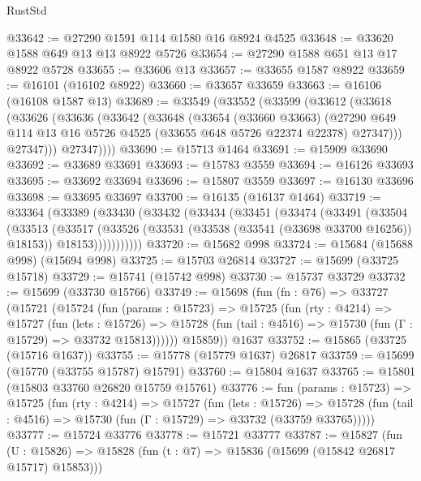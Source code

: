 \begin{lexlean}{RustStd}
\begin{coremodule}
@33642 := @27290 @1591 @114 @1580 @16 @8924 @4525
@33648 := @33620 @1588 @649 @13 @13 @8922 @5726
@33654 := @27290 @1588 @651 @13 @17 @8922 @5728
@33655 := @33606 @13
@33657 := @33655 @1587 @8922
@33659 := @16101 (@16102 @8922)
@33660 := @33657 @33659
@33663 := @16106 (@16108 @1587 @13)
@33689 := @33549
    (@33552
      (@33599
        (@33612
          (@33618
            (@33626
              (@33636
                (@33642
                  (@33648
                    (@33654
                      (@33660 @33663)
                      (@27290
                        @649
                        @114
                        @13
                        @16
                        @5726
                        @4525
                        (@33655 @648 @5726 @22374 @22378)
                        @27347)))
                  @27347)))
            @27347))))
@33690 := @15713 @1464
@33691 := @15909 @33690
@33692 := @33689 @33691
@33693 := @15783 @3559
@33694 := @16126 @33693
@33695 := @33692 @33694
@33696 := @15807 @3559
@33697 := @16130 @33696
@33698 := @33695 @33697
@33700 := @16135 (@16137 @1464)
@33719 := @33364
    (@33389
      (@33430
        (@33432
          (@33434
            (@33451
              (@33474
                (@33491
                  (@33504
                    (@33513
                      (@33517
                        (@33526
                          (@33531 (@33538 (@33541 (@33698 @33700 @16256)) @18153))
                          @18153)))))))))))
@33720 := @15682 @998
@33724 := @15684 (@15688 @998) (@15694 @998)
@33725 := @15703 @26814
@33727 := @15699 (@33725 @15718)
@33729 := @15741 (@15742 @998)
@33730 := @15737 @33729
@33732 := @15699 (@33730 @15766)
@33749 := @15698
    (fun (fn : @76) =>
    @33727
      (@15721
        (@15724
          (fun (params : @15723) =>
          @15725
            (fun (rty : @4214) =>
            @15727
              (fun (lets : @15726) =>
              @15728 (fun (tail : @4516) => @15730 (fun (Γ : @15729) => @33732 @15813))))))
        @15859))
    @1637
@33752 := @15865 (@33725 (@15716 @1637))
@33755 := @15778 (@15779 @1637) @26817
@33759 := @15699 (@15770 (@33755 @15787) @15791)
@33760 := @15804 @1637
@33765 := @15801 (@15803 @33760 @26820 @15759 @15761)
@33776 := fun (params : @15723) =>
  @15725
    (fun (rty : @4214) =>
    @15727
      (fun (lets : @15726) =>
      @15728 (fun (tail : @4516) => @15730 (fun (Γ : @15729) => @33732 (@33759 @33765)))))
@33777 := @15724 @33776
@33778 := @15721 @33777
@33787 := @15827
    (fun (U : @15826) => @15828 (fun (t : @7) => @15836 (@15699 (@15842 @26817 @15717) @15853)))

\end{coremodule}
\end{lexlean}
